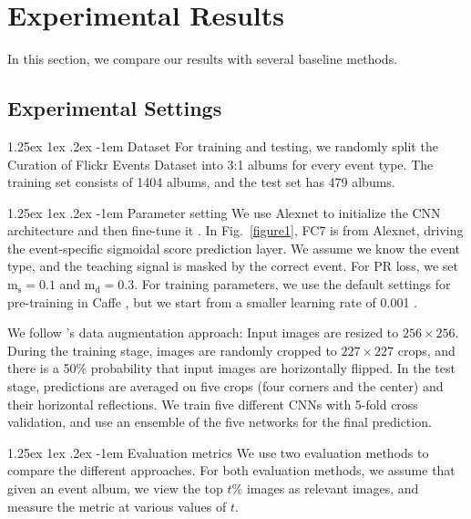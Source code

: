 \documentclass[10pt,twocolumn,letterpaper]{article}
\makeatletter
\renewcommand\paragraph{\@startsection{paragraph}{4}{\z@}%
           {1.25ex \@plus1ex \@minus.2ex}%
           {-1em}%
           {\normalfont\normalsize\bfseries}}
\makeatother
\begin{document}
\section{Experimental Results}
In this section, we compare our results with several baseline methods.
\subsection{Experimental Settings}
\paragraph{Dataset}
For training and testing, we randomly split the  Curation of Flickr Events Dataset into 3:1 albums for every event type. The training set consists of 1404 albums, and the test set has 479 albums. 

\paragraph{Parameter setting}
We use Alexnet to initialize the CNN architecture and then fine-tune it \cite{imagenet,caffe}. In Fig.~\ref{figure1}, FC7 is from Alexnet, driving the event-specific sigmoidal score prediction layer. We assume we know the event type, and the teaching signal is masked by the correct event. For PR loss, we set $\text{m}_\text{s} = 0.1$ and $\text{m}_\text{d} = 0.3$. For training parameters, we use the default settings for pre-training in Caffe \cite{caffe}, but we start from a smaller learning rate of 0.001 \cite{rcnn}. 

We follow \cite{imagenet}'s data augmentation approach: Input images are resized to $256\times 256$. During the training stage, images are randomly cropped to $227 \times 227$ crops, and there is a 50\% probability that input images are horizontally flipped. In the test stage, predictions are averaged on five crops (four corners and the center) and their horizontal reflections. We train five different CNNs with 5-fold cross validation, and use an ensemble of the five networks for the final prediction. 



\paragraph{Evaluation metrics} 
We use two evaluation methods to compare the different approaches. For both evaluation methods, we assume that given an event album, we view the top $t\%$ images as relevant images, and measure the metric at various values of $t$.
\end{document}
